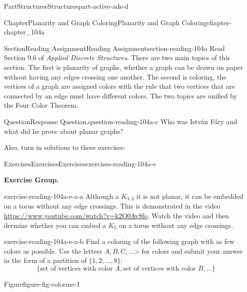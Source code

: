\documentclass[oneside,10pt,]{book}
\numberwithin{equation}{section}
\begin{document}
\begin{partptx}{Part}{Structures}{}{Structures}{}{}{part-active-ads-d}
\begin{chapterptx}{Chapter}{Planarity and Graph Coloring}{}{Planarity and Graph Coloring}{}{}{chapter-chapter_104a}
\begin{sectionptx}{Section}{Reading Assignment}{}{Reading Assignment}{}{}{section-reading-104a}
Read Section 9.6 of \emph{Applied Discrete Structures}. There are two main topics of this section. The first is planarity of graphs, whether a graph can be drawn on paper without having any edges crossing one another.  The second is coloring, the vertices of a graph are assigned colors with the rule that two vertices that are connected by an edge must have different colors.  The two topics are unified by the Four Color Theorem.%
\begin{question}{Question}{Response Question.}{question-reading-104a-c}%
Who was István Fáry and what did he prove about planar graphs?%
\end{question}
Also, turn in solutions to these exercises:%
%
%
\typeout{************************************************}
\typeout{************************************************}
%
\begin{exercises-subsection-numberless}{Exercises}{Exercises}{}{Exercises}{}{}{exercises-reading-104a-e}
\par\medskip\noindent%
\textbf{Exercise Group.}\space\space%
\begin{exercisegroup}
\begin{divisionexerciseeg}{1}{}{}{exercise-reading-104a-e-a-a}%
Although a \(K_{3,3}\) it is not planar, it can be embedded on a torus without any edge crossings.  This is demonstrated in the video \href{https://www.youtube.com/watch?v=k2O0Av_8_fo}{https:\slash{}\slash{}www.youtube.com\slash{}watch?v=k2O0Av\textunderscore{}8\textunderscore{}fo}\footnotemark{}.  Watch the video and then dermine whether you can embed a \(K_5\) on a torus without any edge crossings.%
\end{divisionexerciseeg}%
%
\begin{divisionexerciseeg}{2}{}{}{exercise-reading-104a-e-a-b}%
Find a coloring of the following graph with as few colors as possible.  Use the letters \(A,B,C,  \dots\)\textgreater{} for colors and submit your answer in the form of a partition of \(\{1,2,\dots, 8\}\):%
\begin{equation*}
\{\textrm{set of vertices with color }A, \textrm{set of vertices with color }B, \dots\}
\end{equation*}
%
\begin{sidebyside}{2}{0}{0}{0}%
\begin{sbspanel}{0.5}%
\begin{panelfigureptx}{Figure}{}{figure-fig-colorme-1}{}%

\end{panelfigureptx}
\end{sbspanel}
\end{sidebyside}
\end{divisionexerciseeg}
\end{exercisegroup}
\end{exercises-subsection-numberless}
\end{sectionptx}
\end{chapterptx}
\end{partptx}
\end{document}
